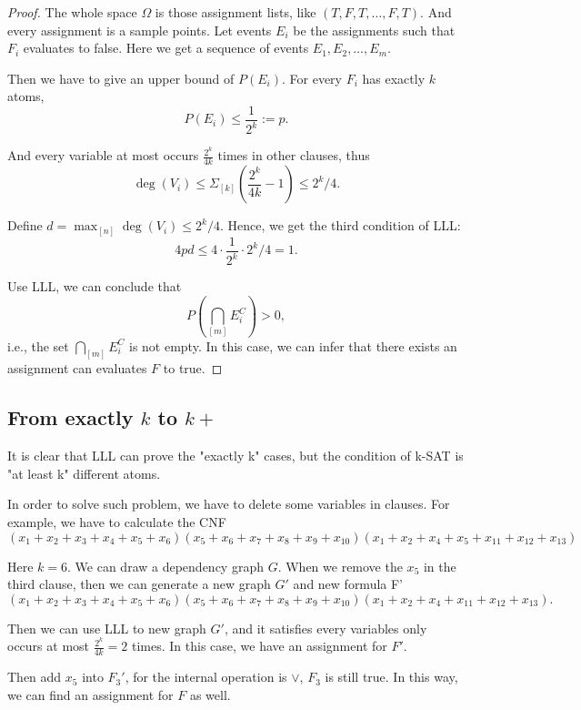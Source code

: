 \begin{proof}
  

The whole space $\Omega $ is those assignment lists, like $(T,F,T,\dots,F,T).$ And every assignment is a sample points.
Let events $E_i$ be the assignments such that $F_i$ evaluates to false. Here we get a sequence of events $E_1,E_2,\dots, E_m$.



Then we have to give an upper bound of $P(E_i).$ For every $F_i$ has exactly $k$ atoms,
$$P(E_i) \leq \frac{1}{2^k} := p.$$

And every variable at most occurs $\frac{2^k}{4k}$ times in other clauses, thus 
$$\deg(V_i) \leq \Sigma_{[k]}(\frac{2^k}{4k}-1) \leq 2^k/4. $$

Define $d = \max_{[n]}\deg(V_i) \leq 2^k/4.$
Hence, we get the third condition of LLL:
$$4pd \leq 4 \cdot \frac{1}{2^k}\cdot 2^k/4 = 1.$$

Use LLL, we can conclude that 
$$P(\bigcap_{[m]}E^C_i) > 0,$$
i.e., the set $\bigcap_{[m]}E^C_i$ is not empty. In this case, we can infer that there exists an assignment can evaluates $F$ to true.

\end{proof}


\newpage
\subsection{From  exactly $k$ to $k+$}
It is clear that LLL can prove the "exactly k" cases, but the condition of k-SAT is "at least k" different atoms. 

In order to solve such problem, we have to delete some variables in clauses. For example, we have to calculate the CNF
$$(x_1 + x_2 + x_3 + x_4 + x_5 + x_6)(x_5 + x_6+x_7 + x_8 +x_9 +x_{10})(x_1+x_2+ x_4+x_5+x_{11} + x_{12} + x_{13})$$

Here $k=6$. We can draw a dependency graph $G$. 
When we remove the $x_5$ in the third clause, then we can generate a new graph $G'$ and new formula F'
$$(x_1 + x_2 + x_3 + x_4 + x_5 + x_6)(x_5 + x_6+x_7 + x_8 +x_9 +x_{10})(x_1+x_2+ x_4+x_{11} + x_{12} + x_{13}).$$

Then we can use LLL to new graph $G'$, and it satisfies every variables only occurs at most $\frac{2^k}{4k} = 2$ times. In this case, we have an assignment for $F'$.

Then add $x_5$ into $F_3'$, for  the internal operation is $\vee$, $F_3$ is still true. In this way, we can find an assignment for $F$ as well.

